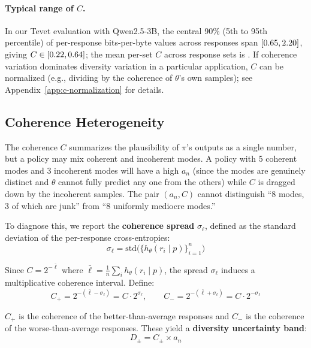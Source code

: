 \paragraph{Typical range of $C$.} In our Tevet evaluation with Qwen2.5-3B, the central 90\% (5th to 95th percentile) of per-response bits-per-byte values across \tevetCoherenceRespCount{} responses span $[0.65, 2.20]$, giving $C \in [0.22, 0.64]$; the mean per-set $C$ across \tevetCoherenceSetCount{} response sets is \tevetCoherenceMeanC.
If coherence variation dominates diversity variation in a particular application, $C$ can be normalized (e.g., dividing by the coherence of $\theta$'s own samples); see Appendix~\ref{app:c-normalization} for details.

\subsection{Coherence Heterogeneity}\label{sec:coherence-hetero}

The coherence $C$ summarizes the plausibility of $\pi$'s outputs as a single number, but a policy may mix coherent and incoherent modes.
A policy with 5 coherent modes and 3 incoherent modes will have a high $a_n$ (since the modes are genuinely distinct and $\theta$ cannot fully predict any one from the others) while $C$ is dragged down by the incoherent samples.
The pair $(a_n, C)$ cannot distinguish ``8 modes, 3 of which are junk'' from ``8 uniformly mediocre modes.''

To diagnose this, we report the \textbf{coherence spread} $\sigma_\ell$, defined as the standard deviation of the per-response cross-entropies:
\begin{equation}
    \sigma_\ell = \mathrm{std}\bigl(\{h_\theta(r_i \mid p)\}_{i=1}^n\bigr)
\end{equation}

Since $C = 2^{-\bar{\ell}}$ where $\bar{\ell} = \frac{1}{n}\sum_i h_\theta(r_i \mid p)$, the spread $\sigma_\ell$ induces a multiplicative coherence interval.
Define:
\begin{equation}
    C_+ = 2^{-(\bar{\ell} - \sigma_\ell)} = C \cdot 2^{\sigma_\ell}, \qquad C_- = 2^{-(\bar{\ell} + \sigma_\ell)} = C \cdot 2^{-\sigma_\ell}
\end{equation}

$C_+$ is the coherence of the better-than-average responses and $C_-$ is the coherence of the worse-than-average responses.
These yield a \textbf{diversity uncertainty band}:
\begin{equation}
    D_\pm = C_\pm \times a_n
\end{equation}

